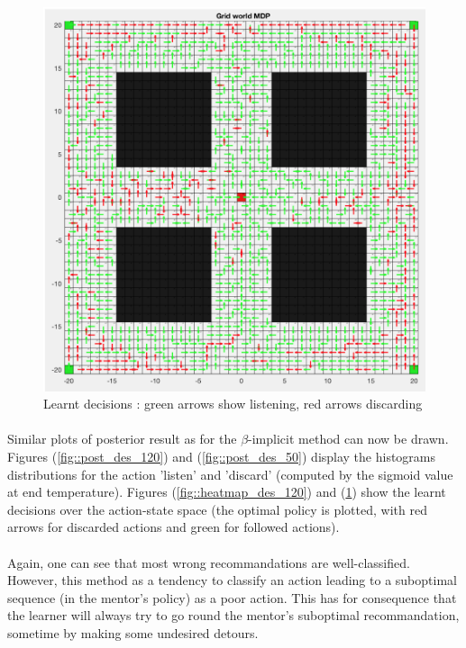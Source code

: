 \documentclass[a4paper]{report}
\begin{document}
{{{{\begin{figure}[ht!]
\begin{minipage}{0.5\linewidth}
\begin{center}
							\includegraphics[width=0.9\linewidth]{heatmap_decision_50}
							\caption{Learnt decisions : green arrows show listening, red arrows discarding}
							\label{fig::heatmap_des_50}
						\end{center}
					\end{minipage}
				\end{figure}
			
			\paragraph{} Similar plots of posterior result as for the $\beta$-implicit method can now be drawn. Figures (\ref{fig::post_des_120}) and (\ref{fig::post_des_50}) display the histograms distributions for the action 'listen' and 'discard' (computed by the sigmoid value at end temperature). Figures (\ref{fig::heatmap_des_120}) and (\ref{fig::heatmap_des_50}) show the learnt decisions over the action-state space (the optimal policy is plotted, with red arrows for discarded actions and green for followed actions).
			
			\paragraph{} Again, one can see that most wrong recommandations are well-classified. However, this method as a tendency to classify an action leading to a suboptimal sequence (in the mentor's policy) as a poor action. This has for consequence that the learner will always try to go round the mentor's suboptimal recommandation, sometime by making some undesired detours. 
			}
		}
}}
\end{document}
